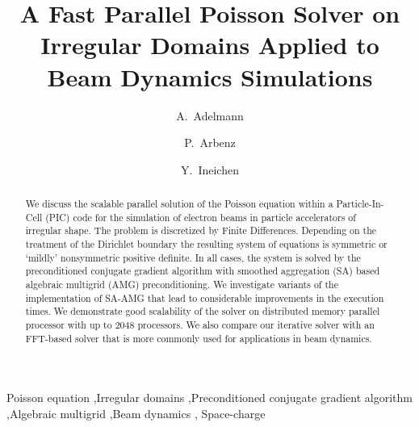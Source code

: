 \documentclass[a4paper,10pt,3p,final,pdftex]{elsarticle}
\begin{document}
\begin{frontmatter}

\title{A Fast Parallel Poisson Solver on Irregular Domains Applied to Beam
  Dynamics Simulations}

\author[psi]{A.~Adelmann}

\author[eth]{P.~Arbenz}

\author[psi,eth]{Y.~Ineichen}

\address[psi]{Paul Scherrer Institut, CH-5234 Villigen, Switzerland}
\address[eth]{ETH Z\"urich, Chair of Computational Science,
  Universit\"atsstrasse 6, CH-8092 Z\"urich, Switzerland}




\begin{abstract}
  We discuss the scalable parallel solution of the Poisson equation
  within a Particle-In-Cell (PIC) code for the simulation of electron
  beams in particle accelerators of irregular shape.  The problem is
  discretized by Finite Differences.  Depending on the treatment of the
  Dirichlet boundary the resulting system of equations is symmetric or
  `mildly' nonsymmetric positive definite.  In all cases, the system is
  solved by the preconditioned conjugate gradient algorithm with
  smoothed aggregation (SA) based algebraic multigrid (AMG)
  preconditioning.  We investigate variants of the implementation of
  SA-AMG that lead to considerable improvements in the execution times.
  We demonstrate good scalability of the solver on distributed memory
  parallel processor with up to 2048 processors.  We also compare our
  iterative solver with an FFT-based solver that is more commonly used
  for applications in beam dynamics.
\end{abstract}

\begin{keyword}
  Poisson equation \sep Irregular domains \sep Preconditioned conjugate
  gradient algorithm \sep Algebraic multigrid \sep Beam dynamics \sep
  Space-charge
\end{keyword}

\end{frontmatter}

\nocite{*}
 






\end{document}
